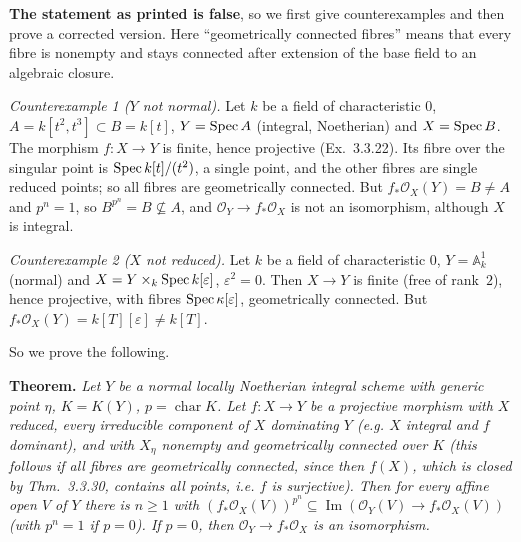 \documentclass[11pt]{article}
\begin{document}
\pf
\textbf{The statement as printed is false}, so we first give counterexamples and then prove a corrected version. Here ``geometrically connected fibres'' means that every fibre is nonempty and stays connected after extension of the base field to an algebraic closure.

\emph{Counterexample 1 ($Y$ not normal).} Let $k$ be a field of characteristic $0$, $A=k[t^2,t^3]\subset B=k[t]$, $Y=\operatorname{Spec} A$ (integral, Noetherian) and $X=\operatorname{Spec} B$. The morphism $f:X\to Y$ is finite, hence projective (Ex.~3.3.22). Its fibre over the singular point is $\operatorname{Spec} k[t]/(t^2)$, a single point, and the other fibres are single reduced points; so all fibres are geometrically connected. But $f_*\mathcal O_X(Y)=B\neq A$ and $p^n=1$, so $B^{p^n}=B\not\subseteq A$, and $\mathcal O_Y\to f_*\mathcal O_X$ is not an isomorphism, although $X$ is integral.

\emph{Counterexample 2 ($X$ not reduced).} Let $k$ be a field of characteristic $0$, $Y=\mathbb A^1_k$ (normal) and $X=Y\times_k\operatorname{Spec} k[\varepsilon]$, $\varepsilon^2=0$. Then $X\to Y$ is finite (free of rank~$2$), hence projective, with fibres $\operatorname{Spec}\kappa[\varepsilon]$, geometrically connected. But $f_*\mathcal O_X(Y)=k[T][\varepsilon]\neq k[T]$.

So we prove the following.

\textbf{Theorem.} \emph{Let $Y$ be a normal locally Noetherian integral scheme with generic point $\eta$, $K=K(Y)$, $p=\operatorname{char}K$. Let $f:X\to Y$ be a projective morphism with $X$ reduced, every irreducible component of $X$ dominating $Y$ (e.g. $X$ integral and $f$ dominant), and with $X_\eta$ nonempty and geometrically connected over $K$ (this follows if all fibres are geometrically connected, since then $f(X)$, which is closed by Thm.~3.3.30, contains all points, i.e. $f$ is surjective). Then for every affine open $V$ of $Y$ there is $n\ge1$ with $(f_*\mathcal O_X(V))^{p^n}\subseteq\operatorname{Im}(\mathcal O_Y(V)\to f_*\mathcal O_X(V))$ (with $p^n=1$ if $p=0$). If $p=0$, then $\mathcal O_Y\to f_*\mathcal O_X$ is an isomorphism.}
\end{document}
